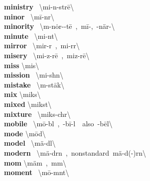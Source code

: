 \documentclass[10pt,a4paper]{article}
\begin{document}
\begin{multicols}{2}
\textbf{ ministry }\quad \ \textbackslash \textprimstress mi-n\textschwa -str\={e}\textbackslash \\
\textbf{ minor }\quad \ \textbackslash \textprimstress m\={i}-n\textschwa r\textbackslash \\
\textbf{ minority }\quad \ \textbackslash m\textschwa -\textprimstress n\.{o}r-\textschwa -t\={e}\ ,\ m\={i}-,\ -\textprimstress n\"{a}r-\textbackslash \\
\textbf{ minute }\quad \ \textbackslash \textprimstress mi-n\textschwa t\textbackslash \\
\textbf{ mirror }\quad \ \textbackslash \textprimstress mir-\textschwa r\ ,\ \textprimstress mi-r\textschwa r\textbackslash \\
\textbf{ misery }\quad \ \textbackslash \textprimstress mi-z\textschwa -r\={e}\ ,\ \textprimstress miz-r\={e}\textbackslash \\
\textbf{ miss }\quad \textbackslash \textprimstress mis\textbackslash \\
\textbf{ mission }\quad \ \textbackslash \textprimstress mi-sh\textschwa n\textbackslash \\
\textbf{ mistake }\quad \ \textbackslash m\textschwa -\textprimstress st\={a}k\textbackslash \\
\textbf{ mix }\quad \textbackslash \textprimstress miks\textbackslash \\
\textbf{ mixed }\quad \textbackslash \textprimstress mikst\textbackslash \\
\textbf{ mixture }\quad \ \textbackslash \textprimstress miks-ch\textschwa r\textbackslash \\
\textbf{ mobile }\quad \ \textbackslash \textprimstress m\={o}-b\textschwa l\ ,\ -\textsecstress b\={i}-\textschwa l\ \ also\ -\textsecstress b\={e}l\textbackslash \\
\textbf{ mode }\quad \textbackslash \textprimstress m\={o}d\textbackslash \\
\textbf{ model }\quad \ \textbackslash \textprimstress m\"{a}-d\textsuperscript{\textreve}l\textbackslash \\
\textbf{ modern }\quad \ \textbackslash \textprimstress m\"{a}-d\textschwa rn\ ,\ nonstandard\ \textprimstress m\"{a}-d(\textschwa -)r\textschwa n\textbackslash \\
\textbf{ mom }\quad \textbackslash \textprimstress m\"{a}m\ ,\ \textprimstress m\textschwa m\textbackslash \\
\textbf{ moment }\quad \ \textbackslash \textprimstress m\={o}-m\textschwa nt\textbackslash \\

\end{multicols}
\end{document}
